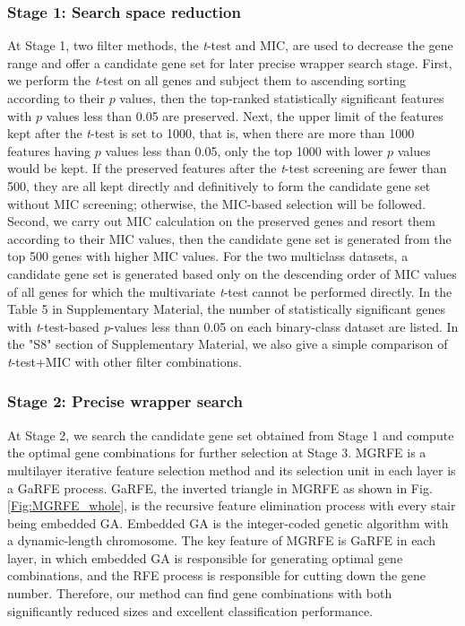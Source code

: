 \documentclass[10pt,journal,compsoc]{IEEEtran}
\begin{document}
	\subsubsection{Stage 1: Search space reduction}
	
	At Stage 1, two filter methods, the \textit{t}-test and MIC, are used to decrease the gene range and offer a candidate gene set for later precise wrapper search stage. First, we perform the \textit{t}-test on all genes and subject them to ascending sorting according to their $p$ values, then the top-ranked statistically significant features with $p$ values less than 0.05 are preserved. Next, the upper limit of the features kept after the \textit{t}-test is set to 1000, that is, when there are more than 1000 features having $p$ values less than 0.05, only the top 1000 with lower $p$ values would be kept. If the preserved features after the \textit{t}-test screening are fewer than 500, they are all kept directly and definitively to form the candidate gene set without MIC screening; otherwise, the MIC-based selection will be followed. Second, we carry out MIC calculation on the preserved genes and resort them according to their MIC values, then the candidate gene set is generated from the top 500 genes with higher MIC values. For the two multiclass datasets, a candidate gene set is generated based only on the descending order of MIC values of all genes for which the multivariate \textit{t}-test cannot be performed directly. 
	In the Table 5 in Supplementary Material, the number of statistically significant genes with \emph{t}-test-based \emph{p}-values less than 0.05 on each binary-class dataset are listed.
	In the "S8" section of Supplementary Material, we also give a simple comparison of \textit{t}-test+MIC with other filter combinations.

	\subsubsection{Stage 2: Precise wrapper search}
	
	At Stage 2, we search the candidate gene set obtained from Stage 1 and compute the optimal gene combinations for further selection at Stage 3. MGRFE is a multilayer iterative feature selection method and its selection unit in each layer is a GaRFE process. GaRFE, the inverted triangle in MGRFE as shown in Fig. \ref{Fig:MGRFE_whole}, is the recursive feature elimination process with every stair being embedded GA. Embedded GA is the integer-coded genetic algorithm with a dynamic-length chromosome. The key feature of MGRFE is GaRFE in each layer, in which embedded GA is responsible for generating optimal gene combinations, and the RFE process is responsible for cutting down the gene number. Therefore, our method can find gene combinations with both significantly reduced sizes and excellent classification performance.
	
\end{document}
